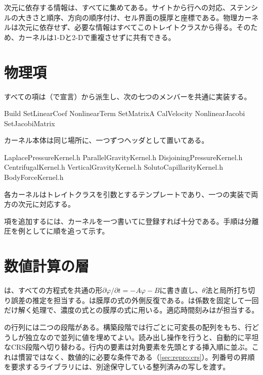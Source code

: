 次元に依存する情報は、すべてに集めてある。サイトから行への対応、ステンシルの大きさと順序、方向の順序付け、セル界面の膜厚と座標である。物理カーネルは次元に依存せず、必要な情報はすべてこのトレイトクラスから得る。そのため、カーネルは1-Dと2-Dで重複させずに共有できる。

\section{物理項}
\label{sec:layout:terms}

すべての項は（で宣言）から派生し、次の七つのメンバーを共通に実装する。

\begin{plain}
Build             SetLinearCoef      NonlinearTerm
SetMatrixA        CalVelocity        NonlinearJacobi
SetJacobiMatrix
\end{plain}

カーネル本体は同じ場所に、一つずつヘッダとして置いてある。

\begin{plain}
LaplacePressureKernel.h     ParallelGravityKernel.h
DisjoiningPressureKernel.h  CentrifugalKernel.h
VerticalGravityKernel.h     SolutoCapillarityKernel.h
BodyForceKernel.h
\end{plain}

各カーネルはトレイトクラスを引数とするテンプレートであり、一つの実装で両方の次元に対応する。

項を追加するには、カーネルを一つ書いてに登録すれば十分である。手順は分離圧を例としてに順を追って示す。

\section{数値計算の層}
\label{sec:layout:numerics}

は、すべての方程式を共通の形$\partial\varphi/\partial t = -A\varphi - B$に書き直し、$\theta$法と局所打ち切り誤差の推定を担当する。は膜厚の式の外側反復である。は係数を固定して一回だけ解く処理で、濃度の式との膜厚の式に用いる。適応時間刻みはが担当する。

の行列には二つの段階がある。構築段階では行ごとに可変長の配列をもち、行どうしが独立なので並列に値を埋めてよい。読み出し操作を行うと、自動的に平坦なCRS段階へ切り替わる。行内の要素は対角要素を先頭とする挿入順に並ぶ。これは慣習ではなく、数値的に必要な条件である（\cref{sec:repro:crs}）。列番号の昇順を要求するライブラリには、別途保守している整列済みの写しを渡す。

